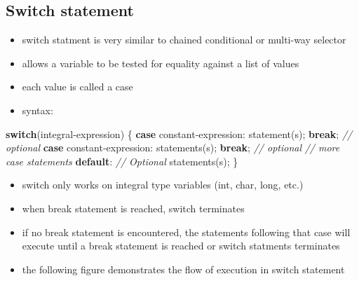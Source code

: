 \documentclass[11pt]{article}
\providecommand{\tightlist}{%
      \setlength{\itemsep}{0pt}\setlength{\parskip}{0pt}}
\newenvironment{Shaded}{}{}
\newcommand{\CommentTok}[1]{\textcolor[rgb]{0.38,0.63,0.69}{\textit{{#1}}}}
\newcommand{\NormalTok}[1]{{#1}}
\newcommand{\ControlFlowTok}[1]{\textcolor[rgb]{0.00,0.44,0.13}{\textbf{{#1}}}}
\newcommand{\OperatorTok}[1]{\textcolor[rgb]{0.40,0.40,0.40}{{#1}}}
\begin{document}
    \hypertarget{switch-statement}{%
\subsection{Switch statement}\label{switch-statement}}

\begin{itemize}
\tightlist
\item
  switch statment is very similar to chained conditional or multi-way
  selector
\item
  allows a variable to be tested for equality against a list of values
\item
  each value is called a case
\item
  syntax:
\end{itemize}

\begin{Shaded}
\begin{Highlighting}[]
    \ControlFlowTok{switch}\OperatorTok{(}\NormalTok{integral}\OperatorTok{{-}}\NormalTok{expression}\OperatorTok{)} \OperatorTok{\{}
        \ControlFlowTok{case}\NormalTok{ constant}\OperatorTok{{-}}\NormalTok{expression}\OperatorTok{:}
\NormalTok{            statement}\OperatorTok{(}\NormalTok{s}\OperatorTok{);}
            \ControlFlowTok{break}\OperatorTok{;} \CommentTok{// optional}
        \ControlFlowTok{case}\NormalTok{ constant}\OperatorTok{{-}}\NormalTok{expression}\OperatorTok{:}
\NormalTok{            statements}\OperatorTok{(}\NormalTok{s}\OperatorTok{);}
            \ControlFlowTok{break}\OperatorTok{;} \CommentTok{// optional}
        \CommentTok{// more case statements}
        \ControlFlowTok{default}\OperatorTok{:} \CommentTok{// Optional}
\NormalTok{            statements}\OperatorTok{(}\NormalTok{s}\OperatorTok{);}
    \OperatorTok{\}}
\end{Highlighting}
\end{Shaded}

\begin{itemize}
\tightlist
\item
  switch only works on integral type variables (int, char, long, etc.)
\item
  when break statement is reached, switch terminates
\item
  if no break statement is encountered, the statements following that
  case will execute until a break statement is reached or switch
  statments terminates
\item
  the following figure demonstrates the flow of execution in switch
  statement
\end{itemize}
\end{document}
